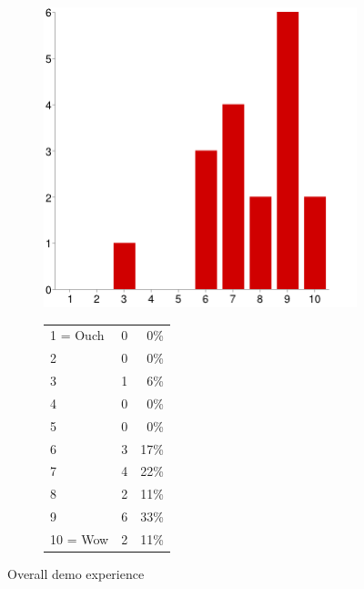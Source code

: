 \documentclass[MSc,paper=a4,pagesize=auto]{icldt}
\begin{document}
\begin{figure}[htbp!]
\centering
\begin{subfigure}{0.4\textwidth}
    \centering
    \includegraphics[width=1\linewidth]{resources/9-overall_experience}
\end{subfigure}%
\centering
\begin{subfigure}{0.5\textwidth}
    \centering
   	\begin{tabular}{ l c r }
1 = Ouch&0&0\% \\
2&0&0\% \\
3&1&6\% \\
4&0&0\% \\
5&0&0\% \\
6&3&17\% \\
7&4&22\% \\
8&2&11\% \\
9&6&33\% \\
10 = Wow&2&11\% \\

\end{tabular}
\end{subfigure} 
    \caption{Overall demo experience}
    \label{fig:9-overall_experience}
\end{figure}

\end{document}
